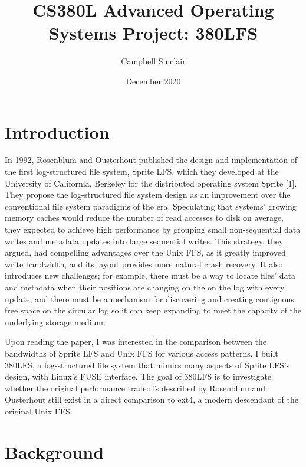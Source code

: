 \documentclass{article}
\title{CS380L Advanced Operating Systems Project: 380LFS}
\author{Campbell Sinclair}
\date{December 2020}
\begin{document}
\maketitle

\section{Introduction}

In 1992, Rosenblum and Ousterhout published the design and implementation of the first log-structured file system, Sprite LFS, which they developed at the University of California, Berkeley for the distributed operating system Sprite [1]. They propose the log-structured file system design as an improvement over the conventional file system paradigms of the era. Speculating that systems’ growing memory caches would reduce the number of read accesses to disk on average, they expected to achieve high performance by grouping small non-sequential data writes and metadata updates into large sequential writes. This strategy, they argued, had compelling advantages over the Unix FFS, as it greatly improved write bandwidth, and its layout provides more natural crash recovery. It also introduces new challenges; for example, there must be a way to locate files’ data and metadata when their positions are changing on the on the log with every update, and there must be a mechanism for discovering and creating contiguous free space on the circular log so it can keep expanding to meet the capacity of the underlying storage medium.

Upon reading the paper, I was interested in the comparison between the bandwidths of Sprite LFS and Unix FFS for various access patterns. I built 380LFS, a log-structured file system that mimics many aspects of Sprite LFS’s design, with Linux’s FUSE interface. The goal of 380LFS is to investigate whether the original performance tradeoffs described by Rosenblum and Ousterhout still exist in a direct comparison to ext4, a modern descendant of the original Unix FFS.

\section{Background}
\end{document}
